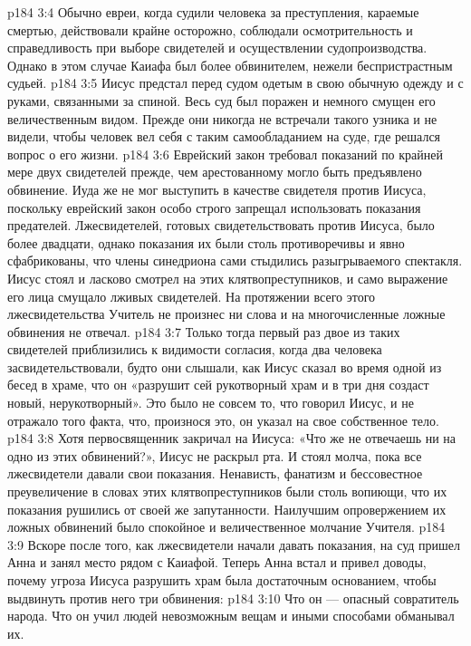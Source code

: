 \vs p184 3:4 Обычно евреи, когда судили человека за преступления, караемые смертью, действовали крайне осторожно, соблюдали осмотрительность и справедливость при выборе свидетелей и осуществлении судопроизводства. Однако в этом случае Каиафа был более обвинителем, нежели беспристрастным судьей.
\vs p184 3:5 \pc Иисус предстал перед судом одетым в свою обычную одежду и с руками, связанными за спиной. Весь суд был поражен и немного смущен его величественным видом. Прежде они никогда не встречали такого узника и не видели, чтобы человек вел себя с таким самообладанием на суде, где решался вопрос о его жизни.
\vs p184 3:6 \pc Еврейский закон требовал показаний по крайней мере двух свидетелей прежде, чем арестованному могло быть предъявлено обвинение. Иуда же не мог выступить в качестве свидетеля против Иисуса, поскольку еврейский закон особо строго запрещал использовать показания предателей. Лжесвидетелей, готовых свидетельствовать против Иисуса, было более двадцати, однако показания их были столь противоречивы и явно сфабрикованы, что члены синедриона сами стыдились разыгрываемого спектакля. Иисус стоял и ласково смотрел на этих клятвопреступников, и само выражение его лица смущало лживых свидетелей. На протяжении всего этого лжесвидетельства Учитель не произнес ни слова и на многочисленные ложные обвинения не отвечал.
\vs p184 3:7 Только тогда первый раз двое из таких свидетелей приблизились к видимости согласия, когда два человека засвидетельствовали, будто они слышали, как Иисус сказал во время одной из бесед в храме, что он «разрушит сей рукотворный храм и в три дня создаст новый, нерукотворный». Это было не совсем то, что говорил Иисус, и не отражало того факта, что, произнося это, он указал на свое собственное тело.
\vs p184 3:8 Хотя первосвященник закричал на Иисуса: «Что же не отвечаешь ни на одно из этих обвинений?», Иисус не раскрыл рта. И стоял молча, пока все лжесвидетели давали свои показания. Ненависть, фанатизм и бессовестное преувеличение в словах этих клятвопреступников были столь вопиющи, что их показания рушились от своей же запутанности. Наилучшим опровержением их ложных обвинений было спокойное и величественное молчание Учителя.
\vs p184 3:9 Вскоре после того, как лжесвидетели начали давать показания, на суд пришел Анна и занял место рядом с Каиафой. Теперь Анна встал и привел доводы, почему угроза Иисуса разрушить храм была достаточным основанием, чтобы выдвинуть против него три обвинения:
\vs p184 3:10 \bibnobreakspace Что он --- опасный совратитель народа. Что он учил людей невозможным вещам и иными способами обманывал их.
